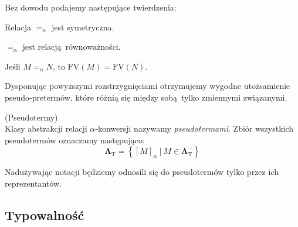 \noindent Bez dowodu podajemy następujące twierdzenia:
    \begin{fakt}
      Relacja \(=_{\alpha}\) jest symetryczna.
    \end{fakt}
    \begin{fakt}
      \(=_{\alpha}\) jest relacją równoważności.
    \end{fakt}
    \begin{fakt}
      Jeśli \(M=_\alpha N\), to \(\mathrm{FV}(M)=\mathrm{FV}(N)\).
    \end{fakt}

Dysponując powyższymi rozstrzygnięciami otrzymujemy wygodne utożsamienie pseudo-pretermów,
które różnią się między sobą tylko zmiennymi związanymi.

\begin{definicja}(Pseudotermy)\\
  Klasy abstrakcji relacji \(\alpha\)-konwersji nazywamy \emph{pseudotermami}. Zbiór wszystkich pseudotermów oznaczamy następująco:
\[
  \mathbf{\Lambda}_{\mathrm{T}}=\left\{[M]_\alpha\:|\: M\in\mathbf{\Lambda}^{-}_\mathrm{T}\right\}
\]
\end{definicja}
Nadużywając notacji będziemy odnosili się do pseudotermów tylko przez ich reprezentantów.
\subsection{Typowalność} 
    

